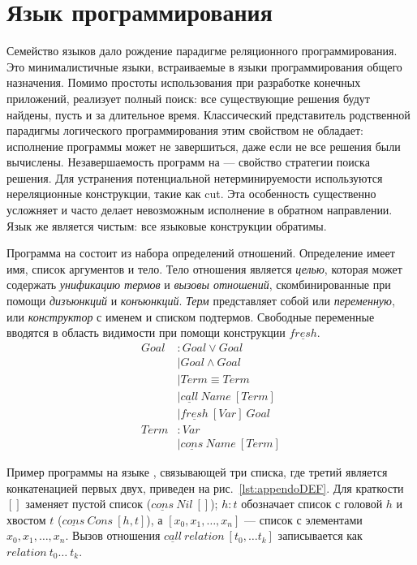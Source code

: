 \documentclass[conference,american,russian]{IEEEtran}
\begin{document}
\section{Язык программирования \miniKanren{}}\label{miniKanren}

Семейство языков \miniKanren{} дало рождение парадигме реляционного программирования. 
Это минималистичные языки, встраиваемые в языки программирования общего назначения. 
Помимо простоты использования при разработке конечных приложений, \miniKanren{} реализует полный поиск: все существующие решения будут найдены, пусть и за длительное время.
Классический представитель родственной парадигмы логического программирования \prolog{} этим свойством не обладает: исполнение программы может не завершиться, даже если не все решения были вычислены. 
Незавершаемость программ на \prolog{} --- свойство стратегии поиска решения.
Для устранения потенциальной нетерминируемости используются нереляционные конструкции, такие как cut. 
Эта особенность существенно усложняет и часто делает невозможным исполнение в обратном направлении. 
Язык \miniKanren{} же является чистым: все языковые конструкции обратимы. 

Программа на \miniKanren{} состоит из набора определений отношений. 
Определение имеет имя, список аргументов и тело.
Тело отношения является \textit{целью}, которая может содержать \textit{унификацию термов} и \textit{вызовы отношений}, скомбинированные при помощи \textit{дизъюнкций} и \textit{конъюнкций}. 
\textit{Терм} представляет собой или \textit{переменную}, или \textit{конструктор} с именем и списком подтермов. 
Свободные переменные вводятся в область видимости при помощи конструкции $\underline{fresh}$. 
\begin{align*}
  Goal &: Goal \vee Goal \\
       &\mid Goal \wedge Goal \\
       &\mid Term \equiv Term \\
       &\mid \underline{call} \ Name \ [Term] \\
       &\mid \underline{fresh} \ [Var] \ Goal \\
  Term &: Var \\ 
       &\mid \underline{cons} \ Name \ [Term]
\end{align*}

Пример программы на языке \miniKanren{}, связывающей три списка, где третий является конкатенацией первых двух, приведен на рис.~\ref{lst:appendoDEF}. 
Для краткости $[]$ заменяет пустой список ($\underline{cons} \ Nil \ []$); $h : t$ обозначает список с головой $h$ и хвостом $t$ ($\underline{cons} \ Cons \ [h, t]$), а $[x_0, x_1, \dots, x_n]$ --- список с элементами $x_0, x_1, \dots, x_n$. 
Вызов отношения $\underline{call} \ relation \ [t_0, \dots t_k]$ записывается как $relation \ t_0 \dots \ t_k$.
\end{document}
